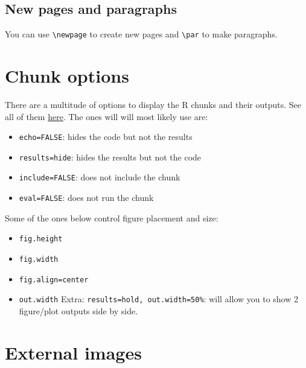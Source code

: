 \documentclass[
]{book}
\providecommand{\tightlist}{%
  \setlength{\itemsep}{0pt}\setlength{\parskip}{0pt}}
\begin{document}
\hypertarget{new-pages-and-paragraphs}{%
\subsection{New pages and paragraphs}\label{new-pages-and-paragraphs}}

You can use \texttt{\textbackslash{}newpage} to create new pages and \texttt{\textbackslash{}par} to make paragraphs.

\hypertarget{chunk-options}{%
\section{Chunk options}\label{chunk-options}}

There are a multitude of options to display the R chunks and their outputs. See all of them \href{https://bookdown.org/yihui/rmarkdown-cookbook/chunk-options.html}{here}. The ones will will most likely use are:

\begin{itemize}
\tightlist
\item
  \texttt{echo=FALSE}: hides the code but not the results
\item
  \texttt{results=\textquotesingle{}hide\textquotesingle{}}: hides the results but not the code
\item
  \texttt{include=FALSE}: does not include the chunk
\item
  \texttt{eval=FALSE}: does not run the chunk
\end{itemize}

Some of the ones below control figure placement and size:

\begin{itemize}
\tightlist
\item
  \texttt{fig.height}
\item
  \texttt{fig.width}
\item
  \texttt{fig.align=\textquotesingle{}center\textquotesingle{}}
\item
  \texttt{out.width} Extra: \texttt{results=\textquotesingle{}hold\textquotesingle{},\ out.width=\textquotesingle{}50\%\textquotesingle{}}: will allow you to show 2 figure/plot outputs side by side.
\end{itemize}

\hypertarget{external-images}{%
\section{External images}\label{external-images}}
\end{document}
